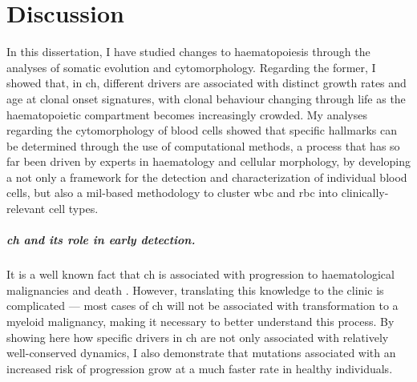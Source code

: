 \chapter{Discussion}

In this dissertation, I have studied changes to haematopoiesis through the analyses of somatic evolution and cytomorphology. Regarding the former, I showed that, in \ac{ch}, different drivers are associated with distinct growth rates and age at clonal onset signatures, with clonal behaviour changing through life as the haematopoietic compartment becomes increasingly crowded. My analyses regarding the cytomorphology of blood cells showed that specific hallmarks can be determined through the use of computational methods, a process that has so far been driven by experts in haematology and cellular morphology, by developing a not only a framework for the detection and characterization of individual blood cells, but also a \ac{mil}-based methodology to cluster \ac{wbc} and \ac{rbc} into clinically-relevant cell types. 
\paragraph{\Ac{ch} and its role in early detection.} It is a well known fact that \ac{ch} is associated with progression to haematological malignancies and death \cite{Genovese2014-eu,Jaiswal2014-rl,Abelson2018-wh}. However, translating this knowledge to the clinic is complicated --- most cases of \ac{ch} will not be associated with transformation to a myeloid malignancy, making it necessary to better understand this process. By showing here how specific drivers in \ac{ch} are not only associated with relatively well-conserved dynamics, I also demonstrate that mutations associated with an increased risk of progression grow at a much faster rate in healthy individuals. 


